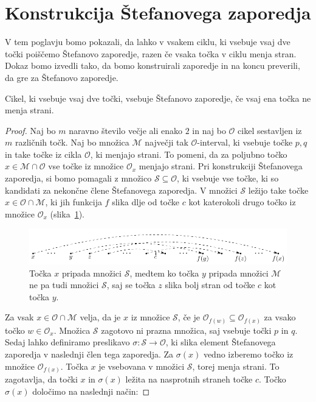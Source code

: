\documentclass[mat2]{fmfdelo}
\begin{document}
\section{Konstrukcija Štefanovega zaporedja} \label{konssz}
V tem poglavju bomo pokazali, da lahko v vsakem ciklu, ki vsebuje vsaj dve točki poiščemo Štefanovo zaporedje, razen če vsaka točka v ciklu menja stran. Dokaz bomo izvedli tako, da bomo konstruirali zaporedje in na koncu preverili, da gre za Štefanovo zaporedje.
\begin{trditev}
Cikel, ki vsebuje vsaj dve točki, vsebuje Štefanovo zaporedje, če vsaj ena točka ne menja strani.
\end{trditev}
\begin{proof}
Naj bo $m$ naravno število večje ali enako $2$ in naj bo $\mathcal{O}$ cikel sestavljen iz $m$ različnih točk. Naj bo množica $\mathcal{M}$ največji tak $\mathcal{O}$-interval, ki vsebuje točke $p, q$ in take točke iz cikla $\mathcal{O}$, ki menjajo strani. To pomeni, da za poljubno točko $x \in \mathcal{M} \cap \mathcal{O}$ vse točke iz množice $\mathcal{O}_x$ menjajo strani. Pri konstrukciji Štefanovega zaporedja, si bomo pomagali z množico $\mathcal{S} \subseteq \mathcal{O}$, ki vsebuje vse točke, ki so kandidati za nekončne člene Štefanovega zaporedja. V množici $\mathcal{S}$ ležijo take točke $x \in \mathcal{O} \cap \mathcal{M}$, ki jih funkcija $f$ slika dlje od točke $c$ kot katerokoli drugo točko iz množice $\mathcal{O}_x$ (slika~\ref{fig:S}). 
\begin{figure}[h]
  \centering
  \includegraphics{images/mnozica_S.pdf}
  \caption[Konstrukcija množice S.]{Točka $x$ pripada množici $\mathcal{S}$, medtem ko točka $y$ pripada množici $\mathcal{M}$ ne pa tudi množici $\mathcal{S}$, saj se točka $z$ slika bolj stran od točke $c$ kot točka $y$.}
  \label{fig:S}
\end{figure}
Za vsak $x \in \mathcal{O} \cap \mathcal{M}$ velja, da je $x$ iz množice $\mathcal{S}$, če je $\mathcal{O}_{f(w)} \subseteq \mathcal{O}_{f(x)}$ za vsako točko $w \in \mathcal{O}_x$. Množica $\mathcal{S}$ zagotovo ni prazna množica, saj vsebuje točki $p$ in $q$. Sedaj lahko definiramo preslikavo $\sigma : \mathcal{S} \to \mathcal{O}$, ki slika element Štefanovega zaporedja v naslednji člen tega zaporedja. Za $\sigma(x)$ vedno izberemo točko iz množice $\mathcal{O}_{f(x)}$. Točka $x$ je vsebovana v množici $\mathcal{S}$, torej menja strani. To zagotavlja, da točki $x$ in $\sigma(x)$ ležita na nasprotnih straneh točke $c$. Točko $\sigma(x)$ določimo na naslednji način:

\end{proof}
\end{document}
